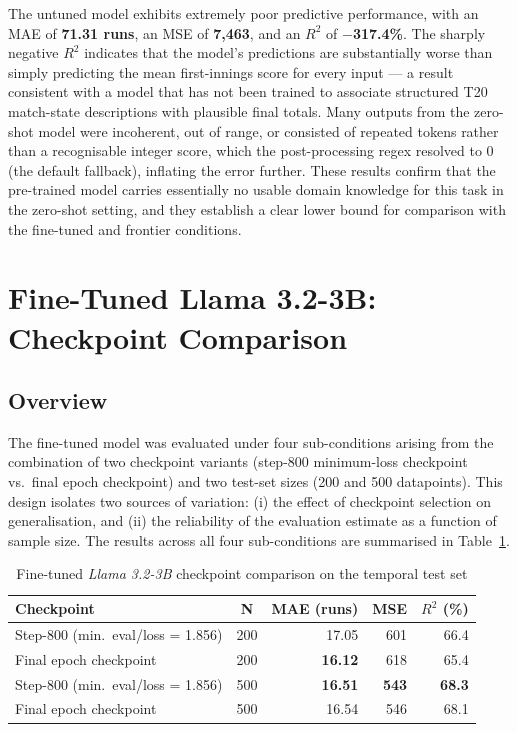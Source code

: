 The untuned model exhibits extremely poor predictive performance, with an MAE of \textbf{71.31 runs}, an MSE of \textbf{7,463}, and an $R^2$ of \textbf{$-$317.4\%}. The sharply negative $R^2$ indicates that the model's predictions are substantially worse than simply predicting the mean first-innings score for every input --- a result consistent with a model that has not been trained to associate structured T20 match-state descriptions with plausible final totals. Many outputs from the zero-shot model were incoherent, out of range, or consisted of repeated tokens rather than a recognisable integer score, which the post-processing regex resolved to 0 (the default fallback), inflating the error further. These results confirm that the pre-trained model carries essentially no usable domain knowledge for this task in the zero-shot setting, and they establish a clear lower bound for comparison with the fine-tuned and frontier conditions.

\section{Fine-Tuned Llama 3.2-3B: Checkpoint Comparison}

\subsection{Overview}

The fine-tuned model was evaluated under four sub-conditions arising from the combination of two checkpoint variants (step-800 minimum-loss checkpoint vs.\ final epoch checkpoint) and two test-set sizes (200 and 500 datapoints). This design isolates two sources of variation: (i) the effect of checkpoint selection on generalisation, and (ii) the reliability of the evaluation estimate as a function of sample size. The results across all four sub-conditions are summarised in Table~\ref{tab:checkpoint_comparison}.

\begin{table}[ht]
\centering
\caption{Fine-tuned \textit{Llama 3.2-3B} checkpoint comparison on the temporal test set}
\label{tab:checkpoint_comparison}
\begin{tabular}{lcrrr}
\hline
\textbf{Checkpoint} & \textbf{N} & \textbf{MAE (runs)} & \textbf{MSE} & \textbf{$R^2$ (\%)} \\
\hline
Step-800 (min.\ eval/loss = 1.856) & 200 & 17.05 & 601 & 66.4 \\
Final epoch checkpoint             & 200 & \textbf{16.12} & 618 & 65.4 \\
\hline
Step-800 (min.\ eval/loss = 1.856) & 500 & \textbf{16.51} & \textbf{543} & \textbf{68.3} \\
Final epoch checkpoint             & 500 & 16.54 & 546 & 68.1 \\
\hline
\end{tabular}
\end{table}

